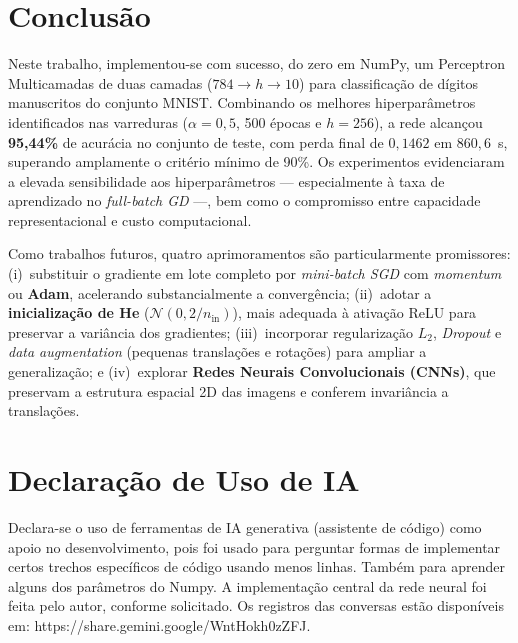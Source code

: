 \section{Conclusão}

Neste trabalho, implementou-se com sucesso, do zero em NumPy, um Perceptron Multicamadas de duas camadas ($784 \to h \to 10$) para classificação de dígitos manuscritos do conjunto MNIST. Combinando os melhores hiperparâmetros identificados nas varreduras ($\alpha = 0{,}5$, 500 épocas e $h = 256$), a rede alcançou \textbf{95,44\%} de acurácia no conjunto de teste, com perda final de $0{,}1462$ em $860{,}6$~s, superando amplamente o critério mínimo de 90\%. Os experimentos evidenciaram a elevada sensibilidade aos hiperparâmetros --- especialmente à taxa de aprendizado no \textit{full-batch GD} ---, bem como o compromisso entre capacidade representacional e custo computacional.

Como trabalhos futuros, quatro aprimoramentos são particularmente promissores: (i)~substituir o gradiente em lote completo por \textit{mini-batch SGD} com \textit{momentum} ou \textbf{Adam}, acelerando substancialmente a convergência; (ii)~adotar a \textbf{inicialização de He} ($\mathcal{N}(0, 2/n_{\text{in}})$), mais adequada à ativação ReLU para preservar a variância dos gradientes; (iii)~incorporar regularização $L_2$, \textit{Dropout} e \textit{data augmentation} (pequenas translações e rotações) para ampliar a generalização; e (iv)~explorar \textbf{Redes Neurais Convolucionais (CNNs)}, que preservam a estrutura espacial 2D das imagens e conferem invariância a translações.

\section*{Declaração de Uso de IA}

Declara-se o uso de ferramentas de IA generativa (assistente de código) como apoio no desenvolvimento, pois foi usado para perguntar formas de implementar certos trechos específicos de código usando menos linhas. Também para aprender alguns dos parâmetros do Numpy. A implementação central da rede neural foi feita pelo autor, conforme solicitado. Os registros das conversas estão disponíveis em: https://share.gemini.google/WntHokh0zZFJ.
